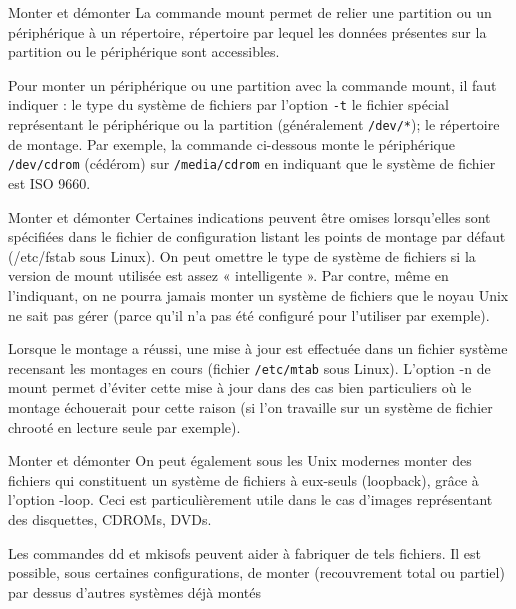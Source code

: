 \documentclass[10pt]{beamer}
\begin{document}
\begin{frame}[fragile]{Monter et démonter}
La commande \alert{mount} permet de relier une partition ou un périphérique à un répertoire,   répertoire   par   lequel   les   données   présentes   sur   la   partition   ou   le
périphérique sont accessibles.

Pour monter un périphérique ou une partition avec la commande  \alert{mount}, il faut
indiquer : le type du système de fichiers par l'option \texttt{-t} le fichier spécial représentant le périphérique ou la partition (généralement \texttt{/dev/*});
le répertoire de montage. Par exemple, la commande ci-dessous monte le périphérique \texttt{/dev/cdrom} (cédérom) sur \texttt{/media/cdrom} en indiquant que le système
de fichier est ISO 9660.


\end{frame}

\begin{frame}{Monter et démonter}
Certaines indications peuvent être omises lorsqu'elles sont spécifiées dans le fichier de configuration listant les points de montage par défaut (/etc/fstab sous Linux).
On peut omettre le type de système de fichiers si la version de mount utilisée est
assez « intelligente ». Par contre, même en l'indiquant, on ne pourra jamais monter
un système de fichiers que le noyau Unix ne sait pas gérer (parce qu'il n'a pas été
configuré pour l'utiliser par exemple).

Lorsque le montage a réussi, une mise à jour est effectuée dans un fichier système
recensant les montages en cours (fichier \texttt{/etc/mtab} sous Linux). L'option -n de
mount permet d'éviter cette mise à jour dans des cas bien particuliers où le montage échouerait pour cette raison (si l'on travaille sur un système de fichier chrooté  en lecture seule par exemple).
\end{frame}

\begin{frame}{Monter et démonter}
On peut également sous les Unix modernes monter des fichiers qui constituent un système  de fichiers à eux-seuls (loopback),  grâce à l'option -loop. Ceci est particulièrement utile dans le cas d'images représentant des disquettes, CDROMs, DVDs. 

Les commandes \alert{dd} et \alert{mkisofs} peuvent aider à fabriquer de tels fichiers. Il est possible, sous certaines configurations, de monter (recouvrement total ou partiel) par dessus d'autres systèmes déjà montés
\end{frame}
\end{document}
